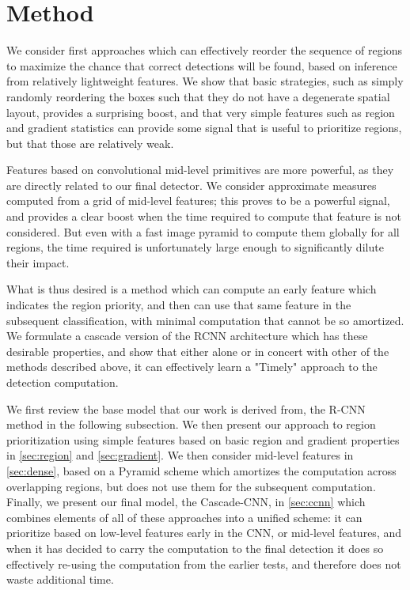 \section{Method}\label{sec:method}

We consider first approaches which can effectively reorder the sequence of regions to maximize the chance that correct detections will be found, based on inference from relatively lightweight features.  We show that basic strategies, such as simply randomly reordering the boxes such that they do not have a degenerate spatial layout, provides a surprising boost, and that very simple features such as region and gradient statistics can provide some signal that is useful to prioritize regions, but that those are relatively weak. 

Features based on convolutional mid-level primitives are more powerful, as they are directly related to our final detector.  We consider approximate measures computed from a grid of mid-level features; this proves to be a powerful signal, and provides a clear boost when the time required to compute that feature is not considered.    But even with a fast image pyramid to compute them globally for all regions, the time required is unfortunately large enough to significantly dilute their impact.   

What is thus desired is a method which can compute an early feature which indicates the region priority, and then can use that same feature in the subsequent classification, with minimal computation that cannot be so amortized.  We formulate a cascade version of the RCNN architecture which has these desirable properties, and show that either alone or in concert with other of the methods described above, it can effectively learn a "Timely" approach to the detection computation.

We first review the base model that our work is derived from, the R-CNN method in the following subsection.  We then present our approach to region prioritization using simple features based on basic region and gradient properties in \autoref{sec:region} and \autoref{sec:gradient}.  We then consider mid-level features in \autoref{sec:dense}, based on a Pyramid scheme which amortizes the computation across overlapping regions, but does not use them for the subsequent computation.  Finally, we present our final model, the Cascade-CNN, in \autoref{sec:ccnn} which combines elements of all of these approaches into a unified scheme: it can prioritize based on low-level features early in the CNN, or mid-level features, and when it has decided to carry the computation to the final detection it does so effectively re-using the computation from the earlier tests, and therefore does not waste additional time.

